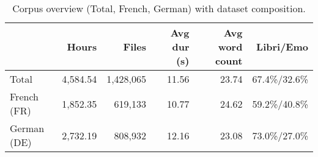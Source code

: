 \begin{table}[htbp]
\centering
\caption{Corpus overview (Total, French, German) with dataset composition.}
\label{tab:dataset_overview}
\begin{tabular}{lrrrrr}
\toprule
 & Hours & Files & Avg dur (s) & Avg word count & Libri/Emo \\
\midrule
Total & 4,584.54 & 1,428,065 & 11.56 & 23.74 & 67.4\%/32.6\% \\
French (FR) & 1,852.35 & 619,133 & 10.77 & 24.62 & 59.2\%/40.8\% \\
German (DE) & 2,732.19 & 808,932 & 12.16 & 23.08 & 73.0\%/27.0\% \\
\bottomrule
\end{tabular}
\end{table}